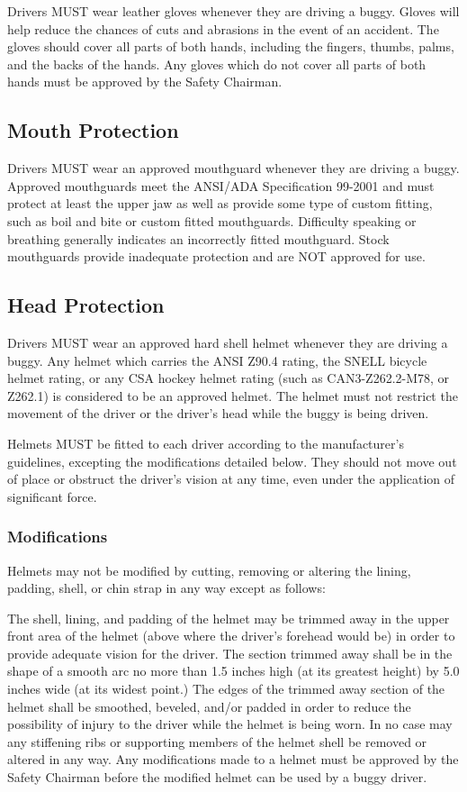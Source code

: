 	Drivers MUST wear leather gloves whenever they are driving a buggy. Gloves will help reduce the chances of cuts and abrasions in the event of an accident. The gloves should cover all parts of both hands, including the fingers, thumbs, palms, and the backs of the hands. Any gloves which do not cover all parts of both hands must be approved by the Safety Chairman.

\subsection{Mouth Protection}

	Drivers MUST wear an approved mouthguard whenever they are driving a buggy. Approved mouthguards meet the ANSI/ADA Specification 99-2001 and must protect at least the upper jaw as well as provide some type of custom fitting, such as boil and bite or custom fitted mouthguards. Difficulty speaking or breathing generally indicates an incorrectly fitted mouthguard. Stock mouthguards provide inadequate protection and are NOT approved for use.

\subsection{Head Protection}

	Drivers MUST wear an approved hard shell helmet whenever they are driving a buggy. Any helmet which carries the ANSI Z90.4 rating, the SNELL bicycle helmet rating, or any CSA hockey helmet rating (such as CAN3-Z262.2-M78, or Z262.1) is considered to be an approved helmet. The helmet must not restrict the movement of the driver or the driver's head while the buggy is being driven.
	
	Helmets MUST be fitted to each driver according to the manufacturer's guidelines, excepting the modifications detailed below. They should not move out of place or obstruct the driver's vision at any time, even under the application of significant force.

\subsubsection{Modifications}

	Helmets may not be modified by cutting, removing or altering the lining, padding, shell, or chin strap in any way except as follows:
	\newline

	The shell, lining, and padding of the helmet may be trimmed away in the upper front area of the helmet (above where the driver's forehead would be) in order to provide adequate vision for the driver. The section trimmed away shall be in the shape of a smooth arc no more than 1.5 inches high (at its greatest height) by 5.0 inches wide (at its widest point.) The edges of the trimmed away section of the helmet shall be smoothed, beveled, and/or padded in order to reduce the possibility of injury to the driver while the helmet is being worn. In no case may any stiffening ribs or supporting members of the helmet shell be removed or altered in any way. Any modifications made to a helmet must be approved by the Safety Chairman before the modified helmet can be used by a buggy driver.
	
